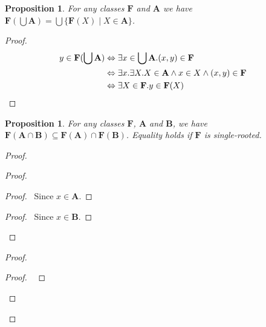 \documentclass{book}
\let\qed\relax
\newtheorem{prop}[ax]{Proposition}
\theoremstyle{definition}
\begin{document}
\begin{prop}
\label{prop:imgunion}
For any classes $\mathbf{F}$ and $\mathbf{A}$ we have $\mathbf{F}(\bigcup \mathbf{A}) = \bigcup \{\mathbf{F}(X) \mid X \in \mathbf{A}\}$.
\end{prop}

\begin{proof}
\pf
\begin{align*}
	y \in \mathbf{F}(\bigcup \mathbf{A}) & \Leftrightarrow \exists x \in \bigcup \mathbf{A}. (x,y) \in \mathbf{F} \\
	& \Leftrightarrow \exists x. \exists X. X \in \mathbf{A} \wedge x \in X \wedge (x,y) \in \mathbf{F} \\
	& \Leftrightarrow \exists X \in \mathbf{F}. y \in \mathbf{F}(X) & \qed
\end{align*}
\end{proof}

\begin{prop}
For any classes $\mathbf{F}$, $\mathbf{A}$ and $\mathbf{B}$, we have $\mathbf{F}(\mathbf{A} \cap \mathbf{B}) \subseteq \mathbf{F}(\mathbf{A}) \cap \mathbf{F}(\mathbf{B})$. Equality holds if $\mathbf{F}$ is single-rooted.
\end{prop}

\begin{proof}
\pf
{}
\begin{proof}
	\begin{proof}
		\pf\ Since $x \in \mathbf{A}$.
	\end{proof}
	\begin{proof}
		\pf\ Since $x \in \mathbf{B}$.
	\end{proof}
\end{proof}
\begin{proof}
	\begin{proof}
		\pf\ 
	\end{proof}
\end{proof}
\qed
\end{proof}
\end{document}
